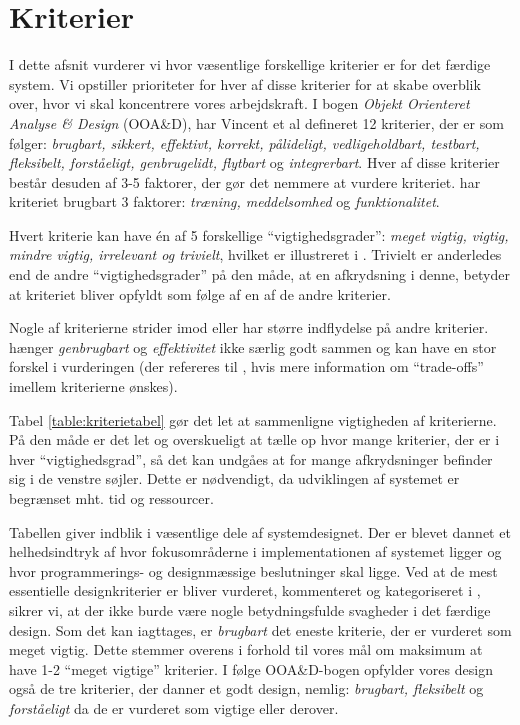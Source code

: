 \section{Kriterier}
\label{sec:kriterier}

I dette afsnit vurderer vi hvor væsentlige forskellige kriterier er for det færdige system. Vi opstiller prioriteter for hver af disse kriterier for at skabe overblik over, hvor vi skal koncentrere vores arbejdskraft. I bogen \emph{Objekt Orienteret Analyse \& Design} (OOA\&D)\cite{ooad}, har Vincent et al defineret 12 kriterier, der er som følger: \emph{brugbart, sikkert, effektivt, korrekt, pålideligt, vedligeholdbart, testbart, fleksibelt, forståeligt, genbrugelidt, flytbart} og \emph{integrerbart}. Hver af disse kriterier består desuden af 3-5 faktorer, der gør det nemmere at vurdere kriteriet. \Fx har kriteriet brugbart 3 faktorer: \emph{træning, meddelsomhed} og \emph{funktionalitet}.

Hvert kriterie kan have én af 5 forskellige ``vigtighedsgrader'': \emph{meget vigtig, vigtig, mindre vigtig, irrelevant og trivielt}, hvilket er illustreret i . Trivielt er anderledes end de andre ``vigtighedsgrader'' på den måde, at en afkrydsning i denne, betyder at kriteriet bliver opfyldt som følge af en af de andre kriterier.
 
Nogle af kriterierne strider imod eller har større indflydelse på andre kriterier. \Fx hænger \emph{genbrugbart} og \emph{effektivitet} ikke særlig godt sammen og kan have en stor forskel i vurderingen (der refereres til \cite[s.~18]{crit}, hvis mere information om ``trade-offs'' imellem kriterierne ønskes).



Tabel \ref{table:kriterietabel} gør det let at sammenligne vigtigheden af kriterierne. På den måde er det let og overskueligt at tælle op hvor mange kriterier, der er i hver ``vigtighedsgrad'', så det kan undgåes at for mange afkrydsninger befinder sig i de venstre søjler. Dette er nødvendigt, da udviklingen af systemet er begrænset mht. tid og ressourcer.

Tabellen giver indblik i væsentlige dele af systemdesignet. Der er blevet dannet et helhedsindtryk af hvor fokusområderne i implementationen af systemet ligger og hvor programmerings- og designmæssige beslutninger skal ligge. Ved at de mest essentielle designkriterier er bliver vurderet, kommenteret og kategoriseret i , sikrer vi, at der ikke burde være nogle betydningsfulde svagheder i det færdige design. Som det kan iagttages, er \emph{brugbart} det eneste kriterie, der er vurderet som meget vigtig. Dette stemmer overens i forhold til vores mål om maksimum at have 1-2 ``meget vigtige'' kriterier. I følge OOA\&D-bogen\cite{ooad} opfylder vores design også de tre kriterier, der danner et godt design, nemlig: \emph{brugbart, fleksibelt} og \emph{forståeligt} da de er vurderet som vigtige eller derover.

